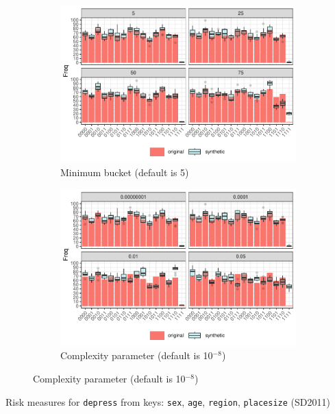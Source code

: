 \documentclass[a4paper,11pt]{style/uneceart}
\begin{document}
\begin{figure}[!h]
    \centering
    \caption{Compare original and synthetic data with different hyperparameters}
    \begin{subfigure}{0.9\textwidth}
        \includegraphics[width=\textwidth]{../graphs/graph_cart_modified_mb_histogram_compare_10_v2.pdf}
        \caption{Minimum bucket (default is 5)}
        \label{fig:attacker_modified_mb_sensitivity}
    \end{subfigure}
    \hfill
    \begin{subfigure}{0.9\textwidth}
        \includegraphics[width=\textwidth]{../graphs/graph_cart_modified_cp_histogram_compare_10_v2.pdf}
        \caption{Complexity parameter (default is 10$^{-8}$)}
        \label{fig:attacker_modified_cp_sensitivity}
    \end{subfigure}
    \label{fig:compare_modified_sensitivity}
\end{figure}


\begin{table}[]
    \centering
    \caption{Risk measures for \texttt{depress} from keys: \texttt{sex}, \texttt{age}, \texttt{region}, \texttt{placesize} (SD2011)}
    
    \label{tab:attribute_risk_sd2011}
\end{table}
\end{document}
